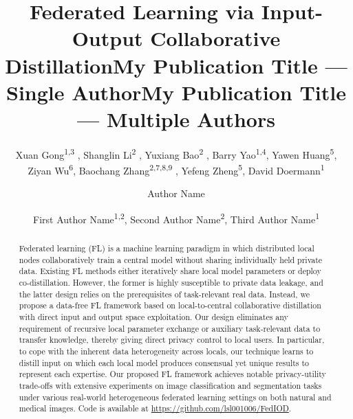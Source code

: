 \documentclass[letterpaper]{article} %
\title{Federated Learning via Input-Output Collaborative Distillation}
\author{
    Xuan Gong\textsuperscript{\rm 1,\rm 3 \equalcontrib},
    Shanglin Li\textsuperscript{\rm 2 \equalcontrib},
    Yuxiang Bao\textsuperscript{\rm 2 \equalcontrib},
    Barry Yao\textsuperscript{\rm 1,\rm 4},
    Yawen Huang\textsuperscript{\rm 5},
    Ziyan Wu\textsuperscript{\rm 6},
    Baochang Zhang\textsuperscript{\rm 2,\rm 7,\rm 8,\rm 9 \dag},
    Yefeng Zheng\textsuperscript{\rm 5},
    David Doermann\textsuperscript{\rm 1 \dag}
}
\title{My Publication Title --- Single Author}
\author {
    Author Name
}
\title{My Publication Title --- Multiple Authors}
\author {
    First Author Name\textsuperscript{\rm 1,\rm 2},
    Second Author Name\textsuperscript{\rm 2},
    Third Author Name\textsuperscript{\rm 1}
}
\begin{document}
\maketitle

\begin{abstract}
   Federated learning (FL) is a machine learning paradigm in which distributed local nodes collaboratively train a central model without sharing individually held private data. Existing FL methods either iteratively share local model parameters or deploy co-distillation. However, the former is highly susceptible to private data leakage, and the latter design relies on the prerequisites of task-relevant real data. Instead, we propose a data-free FL framework based on local-to-central collaborative distillation with direct input and output space exploitation. Our design eliminates any requirement of recursive local parameter exchange or auxiliary task-relevant data to transfer knowledge, thereby giving direct privacy control to local users. In particular, to cope with the inherent data heterogeneity across locals, our technique learns to distill input on which each local model produces consensual yet unique results to represent each expertise. Our proposed FL framework achieves notable privacy-utility trade-offs with extensive experiments on image classification and segmentation tasks under various real-world heterogeneous federated learning settings on both natural and medical images. Code is available at  \url{https://github.com/lsl001006/FedIOD}. 
\end{abstract}
\renewcommand{\thefootnote}{\fnsymbol{footnote}}
\end{document}
